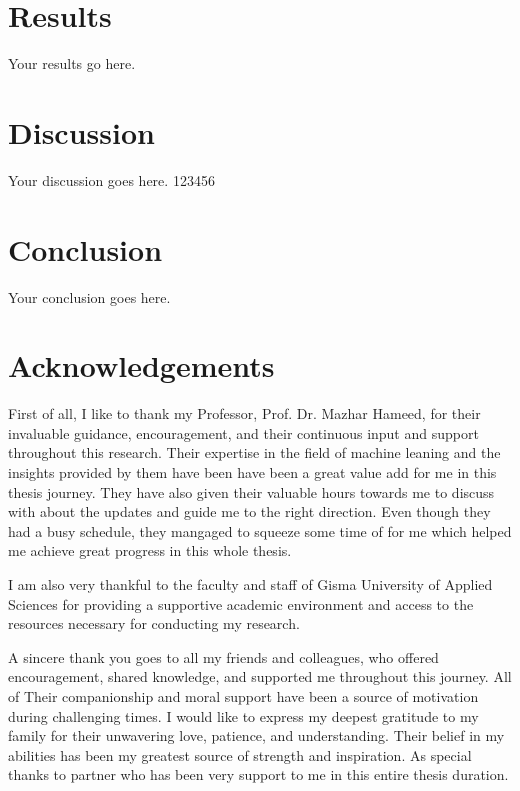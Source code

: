 \documentclass[12pt,onecolumn]{report}
\begin{document}


\chapter{Results}
Your results go here.

\chapter{Discussion}
Your discussion goes here. 123456

\chapter{Conclusion}
Your conclusion goes here.

\chapter*{Acknowledgements}

First of all, I like to thank my Professor, Prof. Dr. Mazhar Hameed, for their invaluable guidance, encouragement, and their continuous input and support throughout this research. Their expertise in the field of machine leaning and the insights provided by them have been have been a great value add for me in this thesis journey. They have also given their valuable hours towards me to discuss with about the updates and guide me to the right direction. Even though they had a busy schedule, they mangaged to squeeze some time of for me which helped me achieve great progress in this whole thesis.

I am also very thankful to the faculty and staff of Gisma University of Applied Sciences for providing a supportive academic environment and access to the resources necessary for conducting my research. 

A sincere thank you goes to all my friends and colleagues, who offered encouragement, shared knowledge, and supported me throughout this journey. All of Their companionship and moral support have been a source of motivation during challenging times. I would like to express my deepest gratitude to my family for their unwavering love, patience, and understanding. Their belief in my abilities has been my greatest source of strength and inspiration. As special thanks to partner who has been very support to me in this entire thesis duration.
\end{document}
